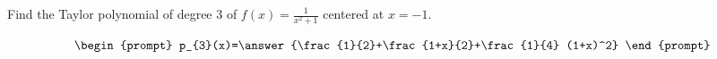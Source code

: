 \documentclass{ximera}
\author{Gregory Hartman \and Matthew Carr}
\begin{document}
\begin{exercise}




Find the Taylor polynomial of degree $3$ of $f(x)=\frac{1}{x^2+1}$ centered at $x=-1$.

\[
\begin{prompt}
p_{3}(x)=\answer{\frac{1}{2}+\frac{1+x}{2}+\frac{1}{4} (1+x)^2}
\end{prompt}
\]

\end{exercise}
\end{document}
